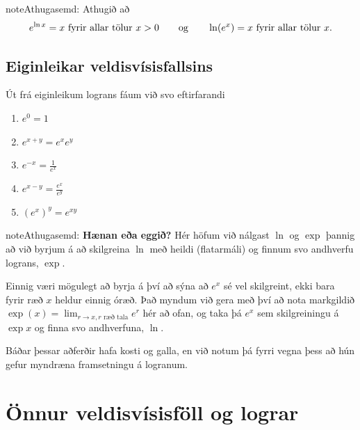 \documentclass[a4paper,10pt,icelandic]{sphinxmanual}
\begin{document}
\begin{notice}{note}{Athugasemd:}
Athugið að
\begin{gather}
\begin{split}e^{\ln x}=x \mbox{ fyrir allar tölur }x>0\qquad \mbox{og}
\qquad \ln(e^x)=x  \mbox{ fyrir allar tölur }x.\end{split}\notag
\end{gather}\end{notice}


\subsection{Eiginleikar veldisvísisfallsins}
\label{kafli04:eiginleikar-veldisvisisfallsins}
Út frá eiginleikum lograns fáum við svo eftirfarandi
\begin{enumerate}
\item {} 
\(e^0=1\)

\item {} 
\(e^{x+y}=e^x e^y\)

\item {} 
\(e^{-x}=\frac{1}{e^x}\)

\item {} 
\(e^{x-y}=\frac{e^x}{e^y}\)

\item {} 
\(\left(e^x\right)^y=e^{xy}\)

\end{enumerate}

\begin{notice}{note}{Athugasemd:}
\textbf{Hænan eða eggið?} Hér höfum við nálgast \(\ln\) og \(\exp\)
þannig að við byrjum á að skilgreina \(\ln\) með heildi (flatarmáli)
og finnum svo andhverfu lograns, \(\exp\).

Einnig væri mögulegt að byrja á því að sýna að \(e^x\) sé vel
skilgreint, ekki bara fyrir ræð \(x\) heldur einnig óræð. Það myndum
við gera með því að nota markgildið
\(\exp(x)=\lim_{r\to x, r\text{ ræð tala}} e^r\)
hér að ofan, og taka þá \(e^x\) sem
skilgreiningu á \(\exp x\) og finna svo andhverfuna, \(\ln\).

Báðar þessar aðferðir hafa kosti og galla, en við notum þá fyrri vegna
þess að hún gefur myndræna framsetningu á logranum.
\end{notice}


\section{Önnur veldisvísisföll og lograr}
\label{kafli04:onnur-veldisvisisfoll-og-lograr}
\end{document}
